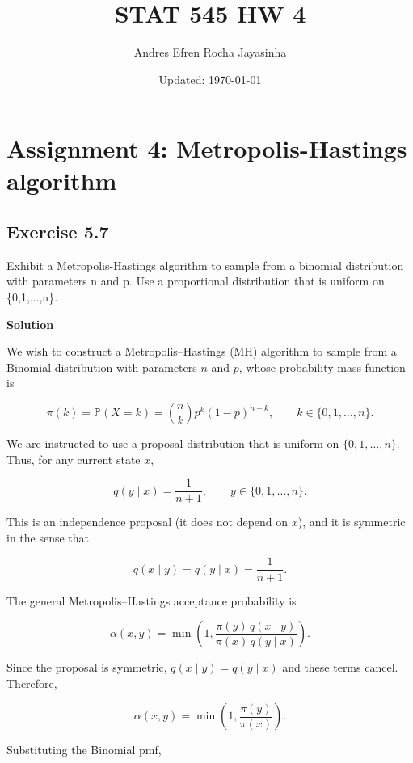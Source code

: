 \documentclass[hidelinks]{article}
\title{\textbf{STAT 545 HW 4}}
\author{Andres Efren Rocha Jayasinha}
\date{Updated: \today} %
\begin{document}
\hypersetup{bookmarksnumbered=true,}
\pagecolor{white}
\color{black}
\maketitle
\begin{Large}
\tableofcontents
\end{Large}%
\pagebreak

\section{Assignment 4: Metropolis-Hastings algorithm}

\subsection{Exercise 5.7}

Exhibit a Metropolis-Hastings algorithm to sample from a binomial distribution with parameters n and p. Use a proportional distribution that is uniform on \{0,1,...,n\}.

\smallskip

\noindent \textbf{Solution}

\noindent We wish to construct a Metropolis--Hastings (MH) algorithm to sample from a 
Binomial distribution with parameters $n$ and $p$, whose probability mass 
function is

\[
\pi(k) = \mathbb{P}(X = k)
= \binom{n}{k} p^k (1-p)^{n-k},
\qquad k \in \{0,1,\dots,n\}.
\]

\noindent We are instructed to use a proposal distribution that is uniform on 
$\{0,1,\dots,n\}$. Thus, for any current state $x$,

\[
q(y \mid x) = \frac{1}{n+1}, 
\qquad y \in \{0,1,\dots,n\}.
\]

\noindent This is an independence proposal (it does not depend on $x$), and it is symmetric in the sense that

\[
q(x \mid y) = q(y \mid x) = \frac{1}{n+1}.
\]


\noindent The general Metropolis--Hastings acceptance probability is

\[
\alpha(x,y)
=
\min\left(
1,
\frac{\pi(y)\, q(x \mid y)}{\pi(x)\, q(y \mid x)}
\right).
\]

\noindent Since the proposal is symmetric, $q(x \mid y) = q(y \mid x)$ and these terms cancel. Therefore,

\[
\alpha(x,y)
=
\min\left(
1,
\frac{\pi(y)}{\pi(x)}
\right).
\]

\noindent Substituting the Binomial pmf,
\end{document}
